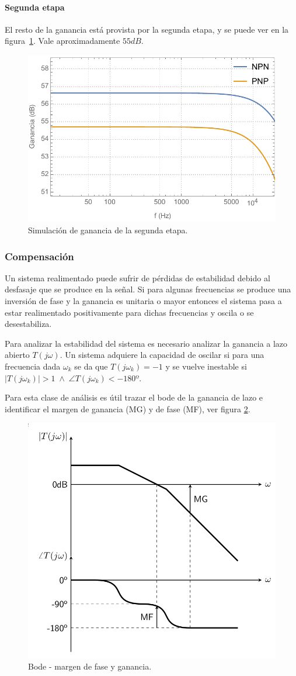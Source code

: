 \documentclass[a4paper,12pt,twoside]{article}
\begin{document}
\paragraph{Segunda etapa}

El resto de la ganancia está provista por la segunda etapa, y se puede ver en la figura~\ref{fig:2da-etapa-bode}. Vale aproximadamente $55dB$.

\begin{figure}[H]
	\centering
	\includegraphics[height=0.4\textwidth]{img/sim/2da-etapa-bode}
	\caption{Simulación de ganancia de la segunda etapa.}
	\label{fig:2da-etapa-bode}
\end{figure}


\subsubsection{Compensación}

Un sistema realimentado puede sufrir de pérdidas de estabilidad debido al desfasaje que se produce en la señal. Si para algunas frecuencias se produce una inversión de fase y la ganancia es unitaria o mayor entonces el sistema pasa a estar realimentado positivamente para dichas frecuencias y oscila o se desestabiliza.

Para analizar la estabilidad del sistema es necesario analizar la ganancia a lazo abierto $T(j\omega)$. Un sistema adquiere la capacidad de oscilar si para una frecuencia dada $\omega_k$ se da que $T(j\omega_k)=-1$ y se vuelve inestable si $\left| T(j\omega_k) \right| > 1 \; \land \; \angle T(j\omega_k) < -180º$.

Para esta clase de análisis es útil trazar el bode de la ganancia de lazo e identificar el margen de ganancia (MG) y de fase (MF), ver figura \ref{fig:margenes}.


\begin{figure}[H]
	\centering
	\includegraphics[height=0.4\textwidth]{img/margenes}
	\caption{Bode - margen de fase y ganancia.}
	\label{fig:margenes}
\end{figure}
\end{document}
